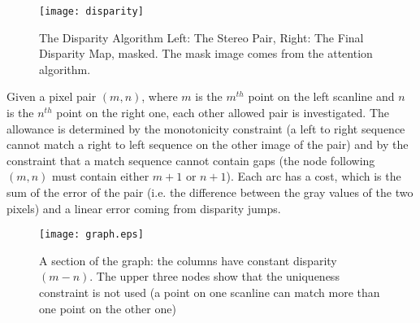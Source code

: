 \begin{figure}
\centering
\texttt{[image: disparity]}
\caption{The Disparity Algorithm  Left: The Stereo Pair, Right: The Final Disparity Map, masked. The mask image comes from the attention algorithm.}
\label{fig-disparity}
\end{figure}

Given a pixel pair $(m,n)$, where $m$ is the $m^{th}$ point on the left scanline and $n$ is the $n^{th}$ point on the right one, each other allowed pair is investigated. The allowance is determined by the monotonicity constraint (a left to right sequence cannot match a right to left sequence on the other image of the pair) and by the constraint that a match sequence cannot contain gaps (the node following $(m,n)$ must contain either $m+1$ or $n+1$).  
Each arc has a cost, which is the sum of the error of the pair (i.e. the difference between the gray values of the two pixels) and a linear error coming from disparity jumps.
\begin{figure}
	\centering
		\texttt{[image: graph.eps]}
	\caption{A section of the graph: the columns have constant disparity $(m-n)$. The upper three nodes show that the uniqueness constraint is not used (a point on one scanline can match more than one point on the other one)}
	\label{fig-graph}
\end{figure}
